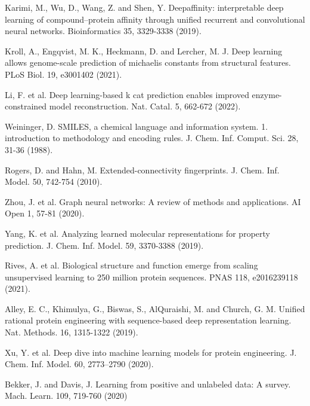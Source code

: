 \documentclass[12pt]{article}
\begin{document}
\begin{thebibliography}{20}
 Karimi, M., Wu, D., Wang, Z. and Shen, Y. Deepaffinity: interpretable deep learning of compound–protein affinity through uniﬁed recurrent and convolutional neural networks. Bioinformatics 35, 3329-3338 (2019).

 Kroll, A., Engqvist, M. K., Heckmann, D. and Lercher, M. J. Deep learning allows genome-scale prediction of michaelis constants from structural features. PLoS Biol. 19, e3001402 (2021).

 Li, F. et al. Deep learning-based k cat prediction enables improved enzyme-constrained model reconstruction. Nat. Catal. 5, 662-672 (2022).

 Weininger, D. SMILES, a chemical language and information system. 1. introduction to methodology and encoding rules. J. Chem. Inf. Comput. Sci. 28, 31-36 (1988).

 Rogers, D. and Hahn, M. Extended-connectivity ﬁngerprints. J. Chem. Inf. Model. 50, 742-754 (2010).

 Zhou, J. et al. Graph neural networks: A review of methods and applications. AI Open 1, 57-81 (2020).

 Yang, K. et al. Analyzing learned molecular representations for property prediction. J. Chem. Inf. Model. 59, 3370-3388 (2019).


 Rives, A. et al. Biological structure and function emerge from scaling unsupervised learning to 250 million protein sequences. PNAS 118, e2016239118 (2021).

 Alley, E. C., Khimulya, G., Biswas, S., AlQuraishi, M. and Church, G. M. Uniﬁed rational protein engineering with sequence-based deep representation learning. Nat. Methods. 16, 1315-1322 (2019).

 Xu, Y. et al. Deep dive into machine learning models for protein engineering. J. Chem. Inf. Model. 60, 2773–2790 (2020).

 Bekker, J. and Davis, J. Learning from positive and unlabeled data: A survey. Mach. Learn. 109, 719-760 (2020)

\end{thebibliography}
\end{document}
